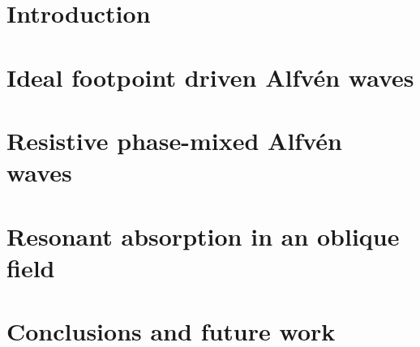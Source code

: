 \documentclass[12pt,fleqn]{report}
\numberwithin{equation}{section}
\begin{document}
\onehalfspacing





 
 
 
\tableofcontents

\chapter{Introduction}
\label{chap:introduction}


\chapter{Ideal footpoint driven Alfv\'en waves}
\label{chap:ideal_footpoint_driven_alfven_waves}


\chapter{Resistive phase-mixed Alfv\'en waves}
\label{chap:resistive_phase_mixed_alfven_waves}

 
\chapter{Resonant absorption in an oblique field}
\label{chap:resonant_absorption_in_an_oblique_field}

 
\chapter{Conclusions and future work}
\label{chap:conclusions_and_future_work}


% 



\end{document}

